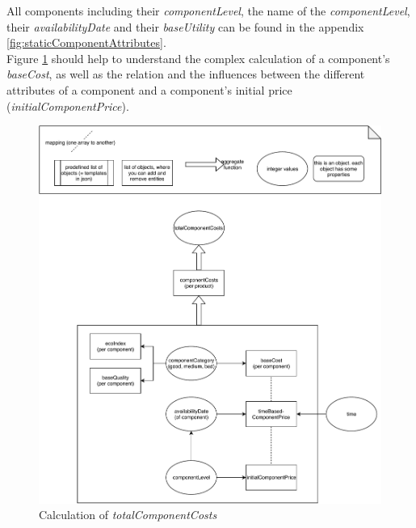 All components including their \textit{componentLevel}, the name of the \textit{componentLevel}, their \textit{availabilityDate} and their \textit{baseUtility} can be found in the appendix \ref{fig:staticComponentAttributes}.\\
Figure \ref{img:totalComponentCosts} should help to understand the complex calculation of a component's \textit{baseCost}, as well as the relation and the influences between the different attributes of a component and a component’s initial price (\textit{initialComponentPrice}).

\begin{figure} [!htbp]
	\centering
	\includegraphics[width=11.5cm]{images/totalComponentCosts.pdf}
	\caption{Calculation of \textit{totalComponentCosts}}
	\label{img:totalComponentCosts}
\end{figure}

